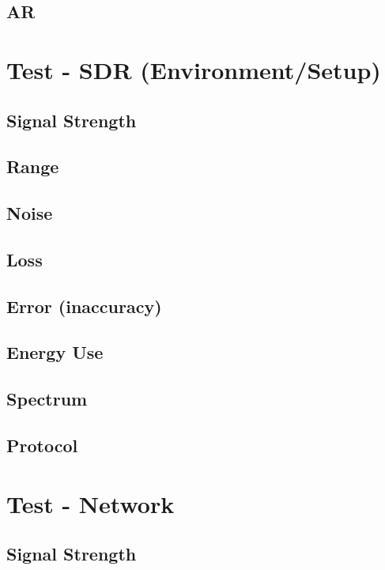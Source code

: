 \subsection{AR}


\section{Test - SDR (Environment/Setup)}

\subsection{Signal Strength}
\subsection{Range}
\subsection{Noise}
\subsection{Loss}
\subsection{Error (inaccuracy)}
\subsection{Energy Use}
\subsection{Spectrum}
\subsection{Protocol}



\section{Test - Network}

\subsection{Signal Strength}
